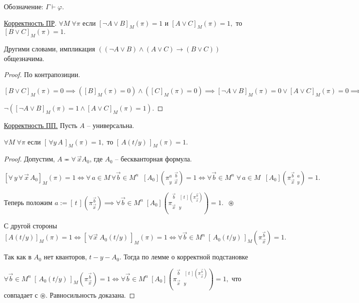\documentclass[a4paper, fleqn]{article}
\begin{document}
    Обозначение: $\Gamma \vdash \varphi.$

    \underline{Корректность ПР}. $\forall M \; \forall \pi$ если $[\neg A \lor B]_M (\pi) = 1$  и $[ A \lor C]_M (\pi) = 1,$ то $[B \lor C]_M (\pi) = 1.$

    Другими словами, импликация $( (\neg A \lor B) \land (A \lor C) \to (B \lor C) )$ общезначима.

    \begin{proof} По контрапозиции.

    $[B \lor C]_M (\pi) = 0 \implies \left([B]_M (\pi) = 0\right) \land \left([C]_M (\pi) = 0\right) \implies [\neg A \lor B]_M (\pi) = 0 \lor   [ A \lor C]_M (\pi) = 0 \implies$

    $ \neg([\neg A \lor B]_M (\pi) = 1 \land   [ A \lor C]_M (\pi) = 1).$
    \end{proof}


    \underline{Корректность ПП.} Пусть $A$ -- универсальна.

    $\forall M \; \forall \pi$ если $[ \, \forall y \,  A \, ]_M (\pi) = 1,$  то $[ \, A(t/y) \, ]_M (\pi) = 1.$

    \begin{proof}
    Допустим, $A \eqcirc \forall \, \overrightarrow{x} A_0$, где $A_0$ -- бескванторная формула.

    $[\forall \, y \, \forall \, \overrightarrow{x} \, A_0 ]_M (\pi) = 1 \iff \forall \, a \in M \, \forall  \overrightarrow{b} \in M^n \;  \; [A_0] \left(\pi^{a \; \; \overrightarrow{b}}_{y \; \; \overrightarrow{x}} \right) = 1 \iff \forall  \overrightarrow{b} \in M^n \;   \forall \, a \in M  \;  \; [A_0] \left(\pi^{\overrightarrow{b} \; \; a}_{\overrightarrow{x} \; \; y} \right) = 1.$

    Теперь положим $a := [ \, t \,]  \left(\pi_{\overrightarrow{x}}^{\overrightarrow{b}} \right) \implies \forall \overrightarrow{b} \in M^n \; [A_0] \left( \pi_{\overrightarrow{x} \; \; \, y}^{\overrightarrow{b} \; \; \; [ \, t \,]  \left(\pi_{\overrightarrow{x}}^{\overrightarrow{b}} \right)} \right) = 1. \; \; \circledast$

    С другой стороны $[A(t/y)]_M(\pi) = 1 \iff [ \, \forall \overrightarrow{x} \; A_0 (t/y) \,  ]_M (\pi) = 1 \iff \forall \overrightarrow{b} \in M^n \; [ \, A_0(t/y) \, ]_M \left(\pi_{\overrightarrow{x}}^{\overrightarrow{b}} \right) = 1.$

    Так как в $A_0$  нет кванторов, $t-y-A_0.$ Тогда по лемме о корректной подстановке

    $\forall \overrightarrow{b} \in M^n \; [ \, A_0(t/y) \, ]_M \left(\pi_{\overrightarrow{x}}^{\overrightarrow{b}} \right) = 1 \iff \forall \overrightarrow{b} \in M^n \; [A_0] \left( \pi_{\overrightarrow{x} \; \; \, y}^{\overrightarrow{b} \; \; \; [ \, t \,]  \left(\pi_{\overrightarrow{x}}^{\overrightarrow{b}} \right)} \right) = 1,$ что совпадает с  $\circledast.$ Равносильность доказана.

    \end{proof}
\end{document}
